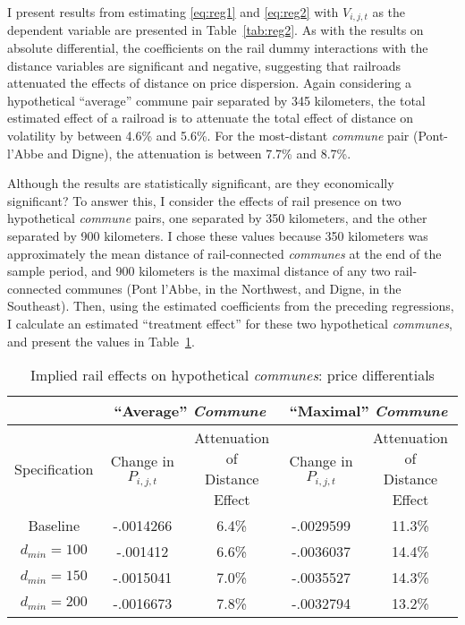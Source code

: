 \documentclass[12pt,twoside]{article}
\begin{document}
I present results from estimating \eqref{eq:reg1} and \eqref{eq:reg2} with $V_{i,j,t}$ as the dependent variable are presented in Table~\ref{tab:reg2}.
As with the results on absolute differential, the coefficients on the rail dummy interactions with the distance variables are significant and negative, suggesting that railroads attenuated the effects of distance on price dispersion.
Again considering a hypothetical ``average'' commune pair separated by 345 kilometers, the total estimated effect of a railroad is to attenuate the total effect of distance on volatility by between 4.6\% and 5.6\%.
For the most-distant \emph{commune} pair (Pont-l'Abbe and Digne), the attenuation is between 7.7\% and 8.7\%.

\begin{landscape}
	
\end{landscape}

Although the results are statistically significant, are they economically significant?
To answer this, I consider the effects of rail presence on two hypothetical \emph{commune} pairs, one separated by 350 kilometers, and the other separated by 900 kilometers.
I chose these values because 350 kilometers was approximately the mean distance of rail-connected \emph{communes} at the end of the sample period, and 900 kilometers is the maximal distance of any two rail-connected communes (Pont l'Abbe, in the Northwest, and Digne, in the Southeast).
Then, using the estimated coefficients from the preceding regressions, I calculate an estimated ``treatment effect'' for these two hypothetical \emph{communes}, and present the values in Table~\ref{tab:treatment1}.

\begin{table}[ht]
	\caption{Implied rail effects on hypothetical \emph{communes}: price differentials} \label{tab:treatment1}
	\begin{tabular}{ |c|c|c|c|c| }
		\hline & \multicolumn{2}{c|}{``Average'' \emph{Commune}} & \multicolumn{2}{c|}{``Maximal'' \emph{Commune}} \\ \hline
		Specification & Change in $P_{i,j,t}$ & \shortstack{Attenuation of \\ Distance Effect} & Change in $P_{i,j,t}$ & \shortstack{Attenuation of \\ Distance Effect} \\ \hline
		Baseline & -.0014266 & 6.4\% & -.0029599 & 11.3\% \\
		$d_{min} = 100$ & -.001412 & 6.6\% & -.0036037 & 14.4\% \\
		$d_{min} = 150$ & -.0015041 & 7.0\% & -.0035527 & 14.3\% \\
		$d_{min} = 200$ & -.0016673 & 7.8\% & -.0032794 & 13.2\% \\ \hline
	\end{tabular}
\end{table}
\end{document}
